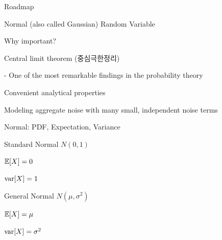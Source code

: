 \begin{frame}{Roadmap}

\plitemsep 0.1in
\bce[(1)]
\item {}

\item {}

\item {}

\item {}

\item {}

\ece
\end{frame}


\begin{frame}{Normal (also called Gaussian) Random Variable}

Why important?

\plitemsep 0.4in
\bci 
\item Central limit theorem (중심극한정리)

- One of the most remarkable findings in the probability theory

\item Convenient analytical properties

\item Modeling aggregate noise with many small, independent noise terms

\eci
\end{frame}

\begin{frame}{Normal: PDF, Expectation, Variance}

{
\plitemsep 0.1in
\bci 
\item<1-> Standard Normal $N(0,1)$
\item<1-> $\mathbb{E}[ X ] = 0$

\item<1-> $\text{var}[ X ] = 1$
\eci
}
{
\plitemsep 0.1in
\bci 
\item<2-> General Normal $N(\mu, \sigma^2)$

\item<2-> $\mathbb{E}[ X ] = \mu$

\item<2-> $\text{var}[ X ] = \sigma^2$

\eci
}

\medskip

\end{frame}

